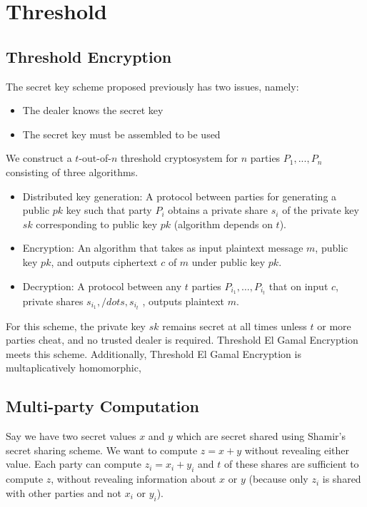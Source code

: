 \section{Threshold}

\subsection{Threshold Encryption}

The secret key scheme
proposed previously has two issues, namely:
\begin{itemize}
    \item The dealer knows the secret key
    \item The secret key must be assembled to be used
\end{itemize}

We construct a $t$-out-of-$n$ threshold
cryptosystem for $n$ parties $P_1, ..., P_n$
consisting of three algorithms.
\begin{itemize}
    \item Distributed key generation: A protocol between parties for generating a public
          $pk$ key such that party $P_i$ obtains a private share $s_i$ of the private key $sk$
          corresponding to public key $pk$ (algorithm depends on $t$).
    \item Encryption: An algorithm that takes as input plaintext message $m$, public key $pk$,
          and outputs ciphertext $c$ of $m$ under public key $pk$.
    \item Decryption: A protocol between any $t$ parties $P_{i_1} ,\dots , P_{i_t}$ that on input $c$, private
          shares $s_{i_1} ,/dots , s_{i_t}$ , outputs plaintext $m$.
\end{itemize}
For this scheme, the private key $sk$ remains secret at all times 
unless $t$ or more parties cheat, and no trusted dealer is 
required. Threshold El Gamal Encryption meets this scheme. 
Additionally, Threshold El Gamal Encryption is multaplicatively 
homomorphic, 

\subsection{Multi-party Computation}

Say we have two secret values $x$ and $y$ which are 
secret shared using Shamir's secret sharing scheme. 
We want to compute $z = x + y$ without revealing either 
value. Each party can compute $z_i = x_i + y_i$ and $t$ 
of these shares are sufficient to compute $z$, without 
revealing information about $x$ or $y$ (because only 
$z_i$ is shared with other parties and not $x_i$ or $y_i$).

